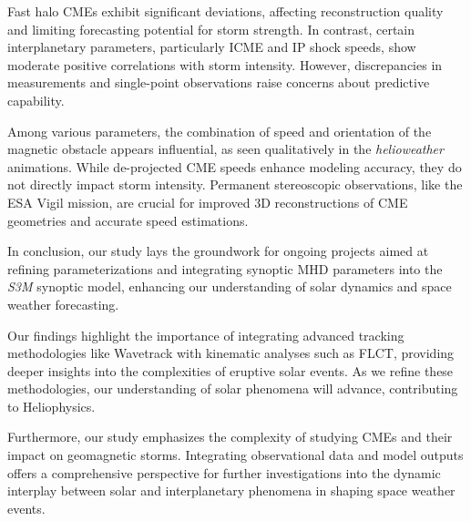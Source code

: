 Fast halo CMEs exhibit significant deviations, affecting reconstruction quality and limiting forecasting potential for storm strength. In contrast, certain interplanetary parameters, particularly ICME and IP shock speeds, show moderate positive correlations with storm intensity. However, discrepancies in measurements and single-point observations raise concerns about predictive capability.

Among various parameters, the combination of speed and orientation of the magnetic obstacle appears influential, as seen qualitatively in the \textit{helioweather} animations. While de-projected CME speeds enhance modeling accuracy, they do not directly impact storm intensity. Permanent stereoscopic observations, like the ESA Vigil mission, are crucial for improved 3D reconstructions of CME geometries and accurate speed estimations.

In conclusion, our study lays the groundwork for ongoing projects aimed at refining parameterizations and integrating synoptic MHD parameters into the \textit{S3M} synoptic model, enhancing our understanding of solar dynamics and space weather forecasting.

Our findings highlight the importance of integrating advanced tracking methodologies like Wavetrack with kinematic analyses such as FLCT, providing deeper insights into the complexities of eruptive solar events. As we refine these methodologies, our understanding of solar phenomena will advance, contributing to Heliophysics.

Furthermore, our study emphasizes the complexity of studying CMEs and their impact on geomagnetic storms. Integrating observational data and model outputs offers a comprehensive perspective for further investigations into the dynamic interplay between solar and interplanetary phenomena in shaping space weather events.

